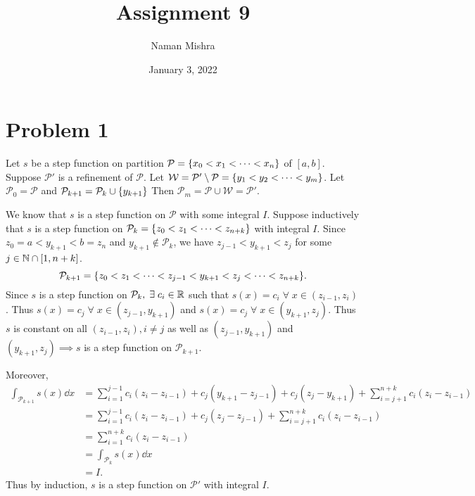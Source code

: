 \documentclass[12pt]{article}
\title{Assignment 9}
\author{Naman Mishra}
\date{January 3, 2022}
\begin{document}
\maketitle

\section*{Problem 1}

Let $s$ be a step function on partition $\mathcal{P} = \set{x_{0} < x_{1} < \dots < x_{n}}$ of $[a, b]$.
Suppose $\mathcal{P}'$ is a refinement of $\mathcal{P}$.
Let $\mathcal{W} = \mathcal{P}' \setminus \mathcal{P} = \set{y_{1} < y_{2} < \dots < y_{m}}$.
Let $\mathcal{P}_{0} = \mathcal{P}$ and $\mathcal{P}_{k+1} = \mathcal{P}_{k} \cup \set{y_{k+1}}$
Then $\mathcal{P}_{m} = \mathcal{P} \cup \mathcal{W} = \mathcal{P}'$.

We know that $s$ is a step function on $\mathcal{P}$ with some integral $I$.
Suppose inductively that $s$ is a step function on $\mathcal{P}_{k} = \set{z_{0} < z_{1} < \dots < z_{n+k}}$ with integral $I$.
Since $z_{0} = a < y_{k+1} < b = z_{n}$ and $y_{k+1} \not\in \mathcal{P}_{k}$, we have $z_{j-1} < y_{k+1} < z_{j}$ for some $j \in \mathbb{N} \cap [1, n+k]$. \[
    \mathcal{P}_{k+1} = \set{z_{0} < z_{1} < \dots < z_{j-1} < y_{k+1} < z_{j} < \dots < z_{n+k}}.
\]
Since $s$ is a step function on $\mathcal{P}_{k}, \;\exists\; c_{i} \in \mathbb{R}$ such that $s(x) = c_{i} \;\forall\; x \in (z_{i-1}, z_{i})$. Thus $s(x) = c_{j} \;\forall\; x \in (z_{j-1}, y_{k+1})$ and $s(x) = c_{j} \;\forall\; x \in (y_{k+1}, z_{j})$.
Thus $s$ is constant on all $(z_{i-1}, z_{i}), i \neq j$ as well as $(z_{j-1}, y_{k+1})$ and $(y_{k+1}, z_{j}) \implies s$ is a step function on $\mathcal{P}_{k+1}$. 

Moreover, \begin{align*}
    \int_{\mathcal{P}_{k+1}} s(x) \dd x &= \sum_{i=1}^{j-1} c_{i} (z_{i} - z_{i-1}) + c_{j} (y_{k+1} - z_{j-1}) + c_{j} (z_{j} - y_{k+1}) + \sum_{i=j+1}^{n+k} c_{i} (z_{i} - z_{i-1}) \\
    &= \sum_{i=1}^{j-1} c_{i} (z_{i} - z_{i-1}) + c_{j} (z_{j} - z_{j-1}) + \sum_{i=j+1}^{n+k} c_{i} (z_{i} - z_{i-1}) \\
    &= \sum_{i=1}^{n+k} c_{i} (z_{i} - z_{i-1}) \\
    &= \int_{\mathcal{P}_{k}} s(x) \dd x \\
    &= I.
\end{align*}
Thus by induction, $s$ is a step function on $\mathcal{P}'$ with integral $I$.
\end{document}
